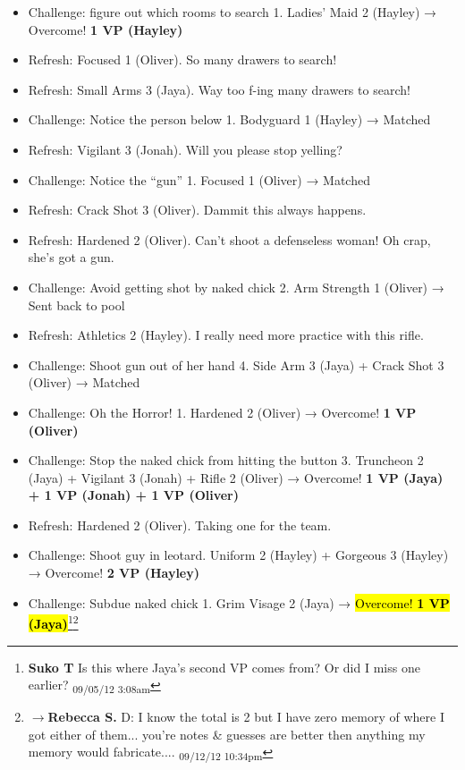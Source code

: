 \begin{itemize}
\item  Challenge: figure out which rooms to search 1. Ladies' Maid 2 (Hayley) → Overcome!  \textbf{1 VP (Hayley)}
\item Refresh: Focused 1 (Oliver).  So many drawers to search!
\item Refresh: Small Arms 3 (Jaya).  Way too f-ing many drawers to search!
\item Challenge: Notice the person below 1.  Bodyguard 1 (Hayley) → Matched
\item Refresh: Vigilant 3 (Jonah).  Will you please stop yelling?
\item Challenge: Notice the ``gun'' 1.  Focused 1 (Oliver) → Matched
\item Refresh: Crack Shot 3 (Oliver).  Dammit this always happens.
\item Refresh: Hardened 2 (Oliver).  Can't shoot a defenseless woman!  Oh crap, she's got a gun.
\item Challenge: Avoid getting shot by naked chick 2.  Arm Strength 1 (Oliver) → Sent back to pool
\item Refresh: Athletics 2 (Hayley). I really need more practice with this rifle.
\item Challenge: Shoot gun out of her hand 4.  Side Arm 3 (Jaya) + Crack Shot 3 (Oliver) → Matched
\item Challenge: Oh the Horror! 1.  Hardened 2 (Oliver) → Overcome! \textbf{1 VP (Oliver)}
\item Challenge: Stop the naked chick from hitting the button 3.  Truncheon 2 (Jaya) + Vigilant 3 (Jonah) + Rifle 2 (Oliver) → Overcome! \textbf{1 VP (Jaya) + 1 VP (Jonah) + 1 VP (Oliver)}
\item Refresh: Hardened 2 (Oliver). Taking one for the team.
\item Challenge: Shoot guy in leotard. Uniform 2 (Hayley) + Gorgeous 3 (Hayley) → Overcome! \textbf{2 VP (Hayley)}
\item Challenge: Subdue naked chick 1.  Grim Visage 2 (Jaya) → \hl{Overcome! \textbf{1 VP (Jaya)}}\footnote{\textbf{Suko T }Is this where Jaya's second VP comes from?  Or did I miss one earlier? \textsubscript{09/05/12 3:08am}}\footnote{$\rightarrow$\textbf{Rebecca S. }D:    I know the total is 2 but I have zero memory of where I got either of them... you're notes \& guesses are better then anything my memory would fabricate.... \textsubscript{09/12/12 10:34pm}}
\end{itemize}



